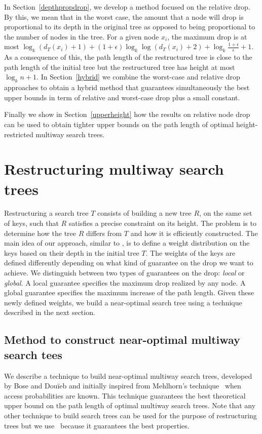 \documentclass{llncs}\usepackage[english]{babel}
\begin{document}
In Section~\ref{depthpropdrop}, we develop a method focused on the relative drop. By this, we mean that in the worst case, the amount that a node will drop is proportional to its depth in the original tree as opposed to being proportional to the number of nodes in the tree. For a given node $x_i$, the maximum drop is at most $\log_{k} (d_T(x_i)+1) + (1+\epsilon) \log_{k} \log (d_T(x_i)+2)+\log_k \frac{1+\epsilon}{\epsilon}+1$. As a consequence of this, the path length of the restructured tree is close to the path length of the initial tree but the restructured tree has height at most $\log_k n +1$. In Section~\ref{hybrid} we combine the worst-case and relative drop approaches to obtain a hybrid method that guarantees simultaneously the best upper bounds in term of relative and worst-case drop plus a small constant. 

Finally we show in Section~\ref{upperheight} how the results on relative node drop can be used to obtain tighter upper bounds on the path length of optimal height-restricted multiway search trees.

\section{Restructuring multiway search trees}
Restructuring a search tree $T$ consists of building a new tree $R$, on the same set of keys, such that $R$ satisfies a precise constraint on its height. The problem is to determine how the tree $R$ differs from $T$ and how it is efficiently constructed. The main idea of our approach, similar to \cite{Gagie}, is to define a weight distribution on the keys based on their depth in the initial tree $T$. The weights of the keys are defined differently depending on what kind of guarantee on the drop we want to achieve. We distinguish between two types of guarantees on the drop: \emph{local} or \emph{global}. A local guarantee specifies the maximum drop realized by any node. A global guarantee specifies the maximum increase of the path length. Given these newly defined weights, we  build a near-optimal search tree using a technique described in the next section. 


\subsection{Method to construct near-optimal multiway search tees}
\label{nearlyopthere}
We describe a technique to build near-optimal multiway search trees, developed by Bose and Dou\"ieb \cite{nearoptbtree} and initially inspired from Mehlhorn's technique~\cite{mehlornbestbound} when access probabilities are known. This technique guarantees the best theoretical upper bound on the path length of optimal multiway search trees. Note that any other technique to build search trees can be used for the purpose of restructuring trees but we use~\cite{nearoptbtree} because it guarantees the best properties. 
\end{document}
